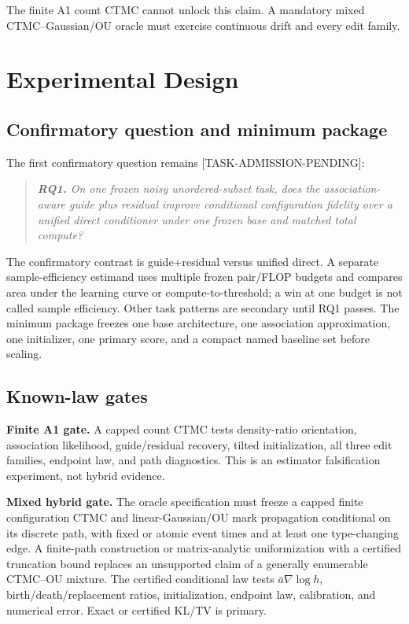 \documentclass[11pt]{article}
\newcommand{\status}[1]{%
  \textcolor{statusred}{\textbf{\texttt{[#1]}}}%
}
\def\status#1{[#1]}%
\begin{document}
The finite A1 count CTMC cannot unlock this claim. A mandatory mixed CTMC--Gaussian/\allowbreak{}OU oracle must exercise continuous drift and every edit family.

\section{Experimental Design}
\label{sec:experimental-design}

\subsection{Confirmatory question and minimum package}
\label{sec:confirmatory-question-and-minimum-package}

The first confirmatory question remains \status{TASK-ADMISSION-PENDING}:

\begin{quote}
\itshape \textbf{RQ1.} On one frozen noisy unordered-subset task, does the association-aware guide plus residual improve conditional configuration fidelity over a unified direct conditioner under one frozen base and matched total compute?
\end{quote}

The confirmatory contrast is guide+residual versus unified direct. A separate sample-efficiency estimand uses multiple frozen pair/\allowbreak{}FLOP budgets and compares area under the learning curve or compute-to-threshold; a win at one budget is not called sample efficiency. Other task patterns are secondary until RQ1 passes. The minimum package freezes one base architecture, one association approximation, one initializer, one primary score, and a compact named baseline set before scaling.

\subsection{Known-law gates}
\label{sec:known-law-gates}

\textbf{Finite A1 gate.} A capped count CTMC tests density-ratio orientation, association likelihood, guide/\allowbreak{}residual recovery, tilted initialization, all three edit families, endpoint law, and path diagnostics. This is an estimator falsification experiment, not hybrid evidence.

\textbf{Mixed hybrid gate.} The oracle specification must freeze a capped finite configuration CTMC and linear-Gaussian/\allowbreak{}OU mark propagation conditional on its discrete path, with fixed or atomic event times and at least one type-changing edge. A finite-path construction or matrix-analytic uniformization with a certified truncation bound replaces an unsupported claim of a generally enumerable CTMC--OU mixture. The certified conditional law tests \(\bar a\nabla\log h\), birth/\allowbreak{}death/\allowbreak{}replacement ratios, initialization, endpoint law, calibration, and numerical error. Exact or certified KL/\allowbreak{}TV is primary.
\end{document}

